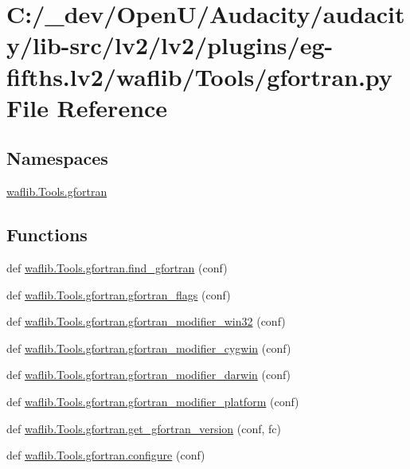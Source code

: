 \hypertarget{lv2_2plugins_2eg-fifths_8lv2_2waflib_2_tools_2gfortran_8py}{}\section{C\+:/\+\_\+dev/\+Open\+U/\+Audacity/audacity/lib-\/src/lv2/lv2/plugins/eg-\/fifths.lv2/waflib/\+Tools/gfortran.py File Reference}
\label{lv2_2plugins_2eg-fifths_8lv2_2waflib_2_tools_2gfortran_8py}
\subsection*{Namespaces}
\begin{DoxyCompactItemize}
\item 
 \hyperlink{namespacewaflib_1_1_tools_1_1gfortran}{waflib.\+Tools.\+gfortran}
\end{DoxyCompactItemize}
\subsection*{Functions}
\begin{DoxyCompactItemize}
\item 
def \hyperlink{namespacewaflib_1_1_tools_1_1gfortran_a831f2f61b251e9981867542649f2339d}{waflib.\+Tools.\+gfortran.\+find\+\_\+gfortran} (conf)
\item 
def \hyperlink{namespacewaflib_1_1_tools_1_1gfortran_a08762d92086757a2af5414ff6aef84e9}{waflib.\+Tools.\+gfortran.\+gfortran\+\_\+flags} (conf)
\item 
def \hyperlink{namespacewaflib_1_1_tools_1_1gfortran_ad22cc6d0d2b302315d031dcb2c035c49}{waflib.\+Tools.\+gfortran.\+gfortran\+\_\+modifier\+\_\+win32} (conf)
\item 
def \hyperlink{namespacewaflib_1_1_tools_1_1gfortran_abf2215270c976ac6aa31055132d201a6}{waflib.\+Tools.\+gfortran.\+gfortran\+\_\+modifier\+\_\+cygwin} (conf)
\item 
def \hyperlink{namespacewaflib_1_1_tools_1_1gfortran_a3124f50b1bc53ecd3fafbcf79f296414}{waflib.\+Tools.\+gfortran.\+gfortran\+\_\+modifier\+\_\+darwin} (conf)
\item 
def \hyperlink{namespacewaflib_1_1_tools_1_1gfortran_af3b109053ce35738f8f717bbd9eb4076}{waflib.\+Tools.\+gfortran.\+gfortran\+\_\+modifier\+\_\+platform} (conf)
\item 
def \hyperlink{namespacewaflib_1_1_tools_1_1gfortran_a9d31db08b155f317bf0b19a8c1f72b57}{waflib.\+Tools.\+gfortran.\+get\+\_\+gfortran\+\_\+version} (conf, fc)
\item 
def \hyperlink{namespacewaflib_1_1_tools_1_1gfortran_acd792ef8a96cbe13a82a54ce98896db5}{waflib.\+Tools.\+gfortran.\+configure} (conf)
\end{DoxyCompactItemize}
